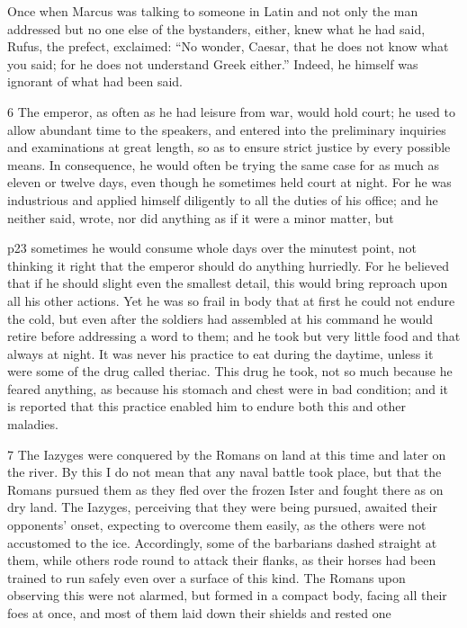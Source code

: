 Once when Marcus was talking to someone in Latin and not only the man addressed but no one else of the bystanders, either, knew what he had said, Rufus, the prefect, exclaimed: ``No wonder, Caesar, that he does not know what you said; for he does not understand Greek either.'' Indeed, he himself was ignorant of what had been said.

6
The emperor, as often as he had leisure from war, would hold court; he used to allow abundant time to the speakers,\texthebrew{⁠} and entered into the preliminary inquiries and examinations at great length, so as to ensure strict justice by every possible means. In consequence, he would often be trying the same case for as much as eleven or twelve days, even though he sometimes held court at night. For he was industrious and applied himself diligently to all the duties of his office; and he neither said, wrote, nor did anything as if it were a minor matter, but

p23 sometimes he would consume whole days over the minutest point, not thinking it right that the emperor should do anything hurriedly. For he believed that if he should slight even the smallest detail, this would bring reproach upon all his other actions. Yet he was so frail in body that at first he could not endure the cold, but even after the soldiers had assembled at his command he would retire before addressing a word to them; and he took but very little food and that always at night. It was never his practice to eat during the daytime, unless it were some of the drug called theriac. This drug he took, not so much because he feared anything, as because his stomach and chest were in bad condition; and it is reported that this practice enabled him to endure both this and other maladies.

7
The Iazyges were conquered by the Romans on land at this time and later on the river. By this I do not mean that any naval battle took place, but that the Romans pursued them as they fled over the frozen Ister and fought there as on dry land. The Iazyges, perceiving that they were being pursued, awaited their opponents' onset, expecting to overcome them easily, as the others were not accustomed to the ice. Accordingly, some of the barbarians dashed straight at them, while others rode round to attack their flanks, as their horses had been trained to run safely even over a surface of this kind. The Romans upon observing this were not alarmed, but formed in a compact body, fa­cing all their foes at once, and most of them laid down their shields and rested one


